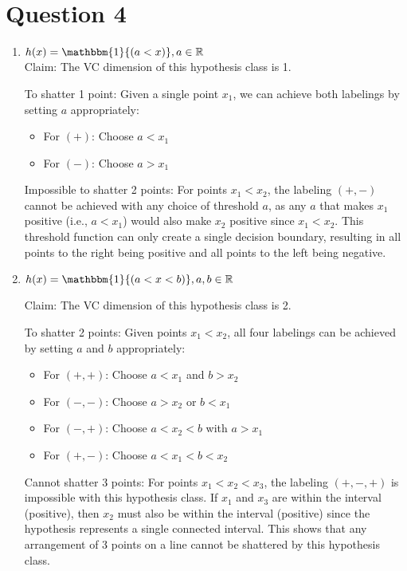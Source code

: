 \documentclass[a4paper]{article}
\begin{document}
\section*{Question 4}
\begin{enumerate}
    \item \textbf{$h(x) = \mathbbm{1}{(a < x)}, a \in \mathbb{R}$}\\

    Claim: The VC dimension of this hypothesis class is 1.
    
    To shatter 1 point: Given a single point $x_1$, we can achieve both labelings by setting $a$ appropriately:
    \begin{itemize}
        \item For $(+)$: Choose $a < x_1$
        \item For $(-)$: Choose $a > x_1$
    \end{itemize}
    
    Impossible to shatter 2 points: For points $x_1 < x_2$, the labeling $(+,-)$ cannot be achieved with any choice of threshold $a$, as any $a$ that makes $x_1$ positive (i.e., $a < x_1$) would also make $x_2$ positive since $x_1 < x_2$. This threshold function can only create a single decision boundary, resulting in all points to the right being positive and all points to the left being negative.\\

    \item \textbf{$h(x) = \mathbbm{1}{(a < x < b)}, a, b \in \mathbb{R}$}

    Claim: The VC dimension of this hypothesis class is 2.
    
    To shatter 2 points: Given points $x_1 < x_2$, all four labelings can be achieved by setting $a$ and $b$ appropriately:
    \begin{itemize}
        \item For $(+,+)$: Choose $a < x_1$ and $b > x_2$
        \item For $(-,-)$: Choose $a > x_2$ or $b < x_1$
        \item For $(-,+)$: Choose $a < x_2 < b$ with $a > x_1$
        \item For $(+,-)$: Choose $a < x_1 < b < x_2$
    \end{itemize}
    
    Cannot shatter 3 points: For points $x_1 < x_2 < x_3$, the labeling $(+,-,+)$ is impossible with this hypothesis class. If $x_1$ and $x_3$ are within the interval (positive), then $x_2$ must also be within the interval (positive) since the hypothesis represents a single connected interval. This shows that any arrangement of 3 points on a line cannot be shattered by this hypothesis class.\\


\end{enumerate}
\end{document}
